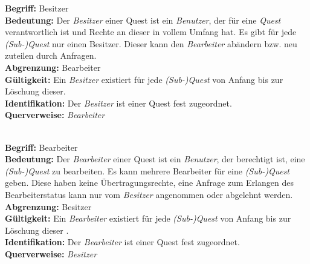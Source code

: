 \documentclass{article}
\begin{document}
\begin{samepage}
\textbf{Begriff:} Besitzer \\
\textbf{Bedeutung:} Der \textit{Besitzer} einer Quest ist ein \textit{Benutzer}, der für eine \textit{Quest} verantwortlich ist und Rechte an dieser in vollem Umfang hat. Es gibt für jede \textit{(Sub-)Quest} nur einen Besitzer. Dieser kann den \textit{Bearbeiter} abändern bzw. neu zuteilen durch Anfragen. \\
\textbf{Abgrenzung:} Bearbeiter \\
\textbf{Gültigkeit:} Ein \textit{Besitzer} existiert für jede \textit{(Sub-)Quest} von Anfang bis zur Löschung dieser. \\
\textbf{Identifikation:} Der \textit{Besitzer} ist einer Quest fest zugeordnet. \\
\textbf{Querverweise:} \textit{Bearbeiter} \\ \\
\end{samepage}

\begin{samepage}
\textbf{Begriff:} Bearbeiter \\
\textbf{Bedeutung:} Der \textit{Bearbeiter} einer Quest ist ein \textit{Benutzer}, der berechtigt ist, eine \textit{(Sub-)Quest} zu bearbeiten. Es kann mehrere Bearbeiter für eine \textit{(Sub-)Quest} geben. Diese haben keine Übertragungsrechte, eine Anfrage zum Erlangen des Bearbeiterstatus kann nur vom \textit{Besitzer} angenommen oder abgelehnt werden.
 \\
\textbf{Abgrenzung:} Besitzer \\
\textbf{Gültigkeit:} Ein \textit{Bearbeiter} existiert für jede \textit{(Sub-)Quest} von Anfang bis zur Löschung dieser . \\
\textbf{Identifikation:} Der \textit{Bearbeiter} ist einer Quest fest zugeordnet. \\
\textbf{Querverweise:} \textit{Besitzer} \\ \\
\end{samepage}
\end{document}

